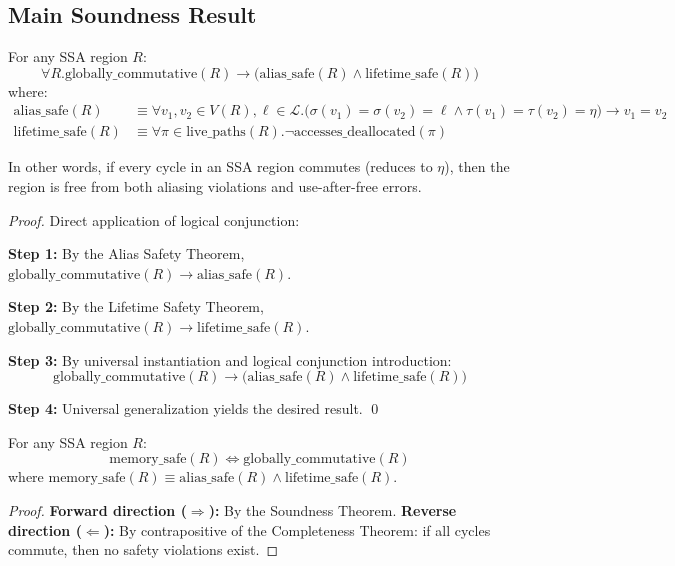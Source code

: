 \documentclass[journal]{IEEEtran}
\begin{document}
\subsection{Main Soundness Result}

\begin{theorem}[Soundness]
For any SSA region $R$:
$$\forall R. \text{globally\_commutative}(R) \rightarrow \big( \text{alias\_safe}(R) \land \text{lifetime\_safe}(R) \big)$$
where:
\begin{align}
\text{alias\_safe}(R) &\equiv \forall v_1, v_2 \in V(R), \ell \in \mathcal{L}. \big( \sigma(v_1) = \sigma(v_2) = \ell \land \tau(v_1) = \tau(v_2) = \eta \big) \rightarrow v_1 = v_2 \\
\text{lifetime\_safe}(R) &\equiv \forall \pi \in \text{live\_paths}(R). \neg \text{accesses\_deallocated}(\pi)
\end{align}

In other words, if every cycle in an SSA region commutes (reduces to $\eta$), then the region is free from both aliasing violations and use-after-free errors.
\end{theorem}

\begin{proof}
Direct application of logical conjunction:

\textbf{Step 1:} By the Alias Safety Theorem, $\text{globally\_commutative}(R) \rightarrow \text{alias\_safe}(R)$.

\textbf{Step 2:} By the Lifetime Safety Theorem, $\text{globally\_commutative}(R) \rightarrow \text{lifetime\_safe}(R)$.

\textbf{Step 3:} By universal instantiation and logical conjunction introduction:
$$\text{globally\_commutative}(R) \rightarrow \big( \text{alias\_safe}(R) \land \text{lifetime\_safe}(R) \big)$$

\textbf{Step 4:} Universal generalization yields the desired result. \qed
\end{proof}

\begin{corollary}
\label{cor:characterization}
For any SSA region $R$:
$$\text{memory\_safe}(R) \Leftrightarrow \text{globally\_commutative}(R)$$
where $\text{memory\_safe}(R) \equiv \text{alias\_safe}(R) \land \text{lifetime\_safe}(R)$.
\end{corollary}

\begin{proof}
\textbf{Forward direction ($\Rightarrow$):} By the Soundness Theorem.
\textbf{Reverse direction ($\Leftarrow$):} By contrapositive of the Completeness Theorem: if all cycles commute, then no safety violations exist.
\end{proof}
\end{document}
